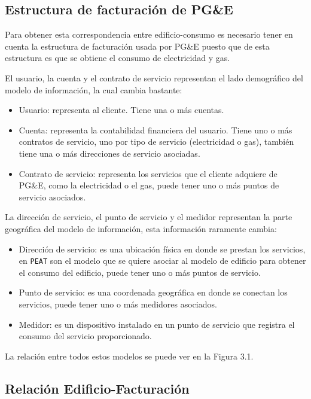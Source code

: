 \subsection{Estructura de facturación de PG\&E}
Para obtener esta correspondencia entre edificio-consumo es necesario
tener en cuenta la estructura de facturación usada por PG\&E puesto
que de esta estructura es que se obtiene el consumo de electricidad y gas.

El usuario, la cuenta y el contrato de servicio representan el lado demográfico
del modelo de información, la cual cambia bastante:

\begin{itemize}
\item Usuario: representa al cliente. Tiene una o más cuentas.
\item Cuenta: representa la contabilidad financiera del usuario. Tiene uno o más
  contratos de servicio, uno por tipo de servicio (electricidad o gas), también
  tiene una o más direcciones de servicio asociadas.
\item Contrato de servicio: representa los servicios que el cliente adquiere
  de PG\&E, como la electricidad o el gas, puede tener uno o más puntos
  de servicio asociados.
\end{itemize}

La dirección de servicio, el punto de servicio y el medidor representan
la parte geográfica del modelo de información, esta información raramente cambia:

\begin{itemize}
\item Dirección de servicio: es una ubicación física en donde se prestan los
  servicios, en \texttt{PEAT} son el modelo que se quiere asociar al modelo
  de edificio para obtener el consumo del edificio, puede tener uno o más puntos
  de servicio.
\item Punto de servicio: es una coordenada geográfica en donde se conectan los
  servicios, puede tener uno o más medidores asociados.
\item Medidor: es un dispositivo instalado en un punto de servicio que registra el
  consumo del servicio proporcionado.
\end{itemize}

La relación entre todos estos modelos se puede ver en la Figura 3.1.


\subsection{Relación Edificio-Facturación}

